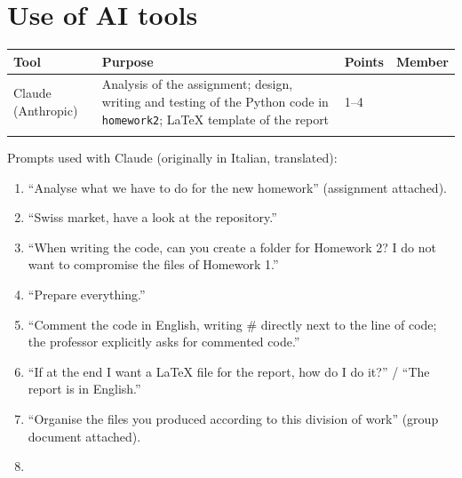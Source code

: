 \section{Use of AI tools}\label{sec:ai}
\begin{table}[H]
\centering\small
\begin{tabular}{p{3.2cm}p{6.8cm}p{2.2cm}p{2.4cm}}
\toprule
Tool & Purpose & Points & Member \\
\midrule
Claude (Anthropic) & Analysis of the assignment; design, writing and testing of the Python code in \texttt{homework2}; LaTeX template of the report & 1--4 & \todo{} \\
\todo{} & \todo{} & \todo{} & \todo{} \\
\bottomrule
\end{tabular}
\end{table}

\noindent Prompts used with Claude (originally in Italian, translated):
\begin{enumerate}
  \item ``Analyse what we have to do for the new homework'' (assignment attached).
  \item ``Swiss market, have a look at the repository.''
  \item ``When writing the code, can you create a folder for Homework 2? I do not want to compromise the files of Homework 1.''
  \item ``Prepare everything.''
  \item ``Comment the code in English, writing \# directly next to the line of code; the professor explicitly asks for commented code.''
  \item ``If at the end I want a LaTeX file for the report, how do I do it?'' / ``The report is in English.''
  \item ``Organise the files you produced according to this division of work'' (group document attached).
  \item {}
\end{enumerate}
